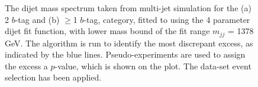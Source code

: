\begin{figure}[!ht]
  \begin{center}
    \captionsetup[subfigure]{aboveskip=0pt,justification=centering}
  \end{center}
  \caption{ The dijet mass spectrum taken from multi-jet simulation for the (a) 2 $b$-tag and (b) $\geq$1 $b$-tag,
    category, fitted to using the 4 parameter dijet fit function, with lower mass bound of the fit range $m_{jj}$ = 1378 GeV.
    The \bh{} algorithm is run to identify the most discrepant excess, as indicated by the blue lines.
    Pseudo-experiments are used to assign the excess a \mbox{$p$-value}, which is shown on the plot. 
    The \summer{} data-set event selection has been applied.}
  \label{fig:Short_4para_1378_figure1}
\end{figure}


